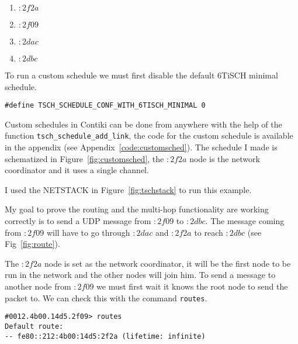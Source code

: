 \begin{enumerate}
  \item $:2f2a$
  \item $:2f09$
  \item $:2dac$
  \item $:2dbc$
\end{enumerate}

To run a custom schedule we must first disable the default 6TiSCH minimal schedule.

\begin{lstlisting}
#define TSCH_SCHEDULE_CONF_WITH_6TISCH_MINIMAL 0
\end{lstlisting}

Custom schedules in Contiki can be done from anywhere with the help of the
function \lstinline{tsch_schedule_add_link}, the code for the custom schedule
is available in the appendix (see Appendix~\ref{code:customsched}).
The schedule I made is schematized in Figure~\ref{fig:customsched}, the $:2f2a$
node is the network coordinator and it uses a single channel.



I used the NETSTACK in Figure~\ref{fig:tschstack} to run this example.



My goal to prove the routing and the multi-hop functionality are working
correctly is to send a UDP message from $:2f09$ to $:2dbc$.
The message coming from $:2f09$ will have to go through $:2dac$ and $:2f2a$ to
reach $:2dbc$ (see Fig~\ref{fig:route}).





The $:2f2a$ node is set as the network coordinator, it will be the first node to be
run in the network and the other nodes will join him.
To send a message to another node from $:2f09$ we must first wait it
knows the root node to send the packet to.
We can check this with the command \lstinline{routes}.

\begin{lstlisting}[language=none]
#0012.4b00.14d5.2f09> routes
Default route:
-- fe80::212:4b00:14d5:2f2a (lifetime: infinite)
\end{lstlisting}

